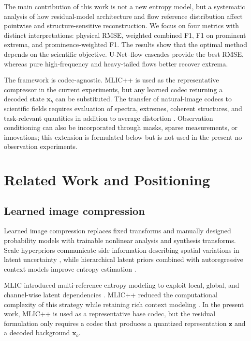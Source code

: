 \documentclass[11pt]{article}
\newcommand{\xb}{\mathbf{x}_{b}}
\newcommand{\z}{\mathbf{z}}
\begin{document}
The main contribution of this work is not a new entropy model, but a systematic analysis of how residual-model architecture and flow reference distribution affect pointwise and structure-sensitive reconstruction. We focus on four metrics with distinct interpretations: physical RMSE, weighted combined F1, F1 on prominent extrema, and prominence-weighted F1. The results show that the optimal method depends on the scientific objective. U-Net--flow cascades provide the best RMSE, whereas pure high-frequency and heavy-tailed flows better recover extrema.

The framework is codec-agnostic. MLIC++ is used as the representative compressor in the current experiments, but any learned codec returning a decoded state $\xb$ can be substituted. The transfer of natural-image codecs to scientific fields requires evaluation of spectra, extremes, coherent structures, and task-relevant quantities in addition to average distortion \cite{di2025survey,gomes2025lossy,mirowski2024neural,han2024cra5}. Observation conditioning can also be incorporated through masks, sparse measurements, or innovations; this extension is formulated below but is not used in the present no-observation experiments.

\section{Related Work and Positioning}

\subsection{Learned image compression}

Learned image compression replaces fixed transforms and manually designed probability models with trainable nonlinear analysis and synthesis transforms. Scale hyperpriors communicate side information describing spatial variations in latent uncertainty \cite{balle2018variational}, while hierarchical latent priors combined with autoregressive context models improve entropy estimation \cite{minnen2018joint}.


MLIC introduced multi-reference entropy modeling to exploit local, global, and channel-wise latent dependencies \cite{jiang2023mlic}. MLIC++ reduced the computational complexity of this strategy while retaining rich context modeling \cite{jiang2025mlicpp}. In the present work, MLIC++ is used as a representative base codec, but the residual formulation only requires a codec that produces a quantized representation $\z$ and a decoded background $\xb$.
\end{document}
